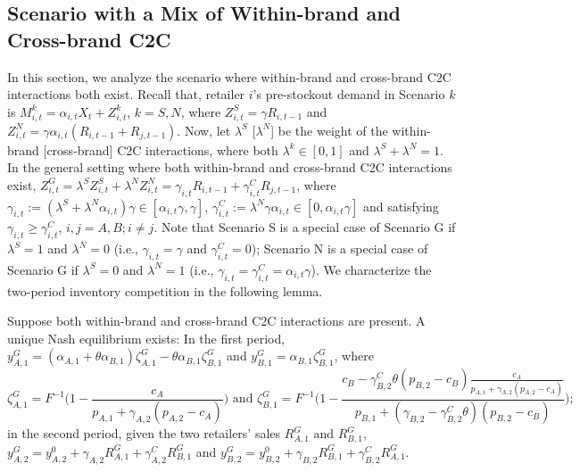 \documentclass[nonblindrev,copyedit]{informs1}
\begin{document}
\begin{APPENDICES}
\section{Scenario with a Mix of Within-brand and Cross-brand C2C} \label{appdx-mix}
In this section, we analyze the scenario where within-brand and cross-brand C2C interactions both exist. Recall that, retailer $i$'s pre-stockout demand in Scenario $k$ is $M^k_{i,t} = \alpha_{i,t} X_t + Z^k_{i,t}$, $k = S, N$, where $Z^S_{i,t} = \gamma R_{i,t-1}$ and $Z^N_{i,t} = \gamma \alpha_{i,t} ( R_{i,t-1} + R_{j,t-1})$. Now, let $\lambda^S$ [$\lambda^N$] be the weight of the within-brand [cross-brand] C2C interactions, where both $\lambda^k \in [0,1]$ and $\lambda^S + \lambda^N = 1$. In the general setting where both within-brand and cross-brand C2C interactions exist, $Z^G_{i,t} = \lambda^S Z^S_{i,t} + \lambda^N Z^N_{i,t} = \gamma_{i,t} R_{i,t-1} + \gamma^C_{i,t}  R_{j, t-1}$, where $\gamma_{i,t}:=(\lambda^S + \lambda^N \alpha_{i,t}) \gamma \in [\alpha_{i,t} \gamma, \gamma]$, $\gamma^C_{i,t} := \lambda^N \gamma \alpha_{i,t} \in [0, \alpha_{i,t} \gamma]$ and satisfying $\gamma_{i,t} \geq \gamma^C_{i,t}$, $i,j = A, B; i \neq j$. Note that Scenario S is a special case of Scenario G if $\lambda^S = 1$ and $\lambda^N = 0$ (i.e., $\gamma_{i,t} = \gamma$ and $\gamma^C_{i,t} = 0$); Scenario N is a special case of Scenario G if $\lambda^S = 0$ and $\lambda^N = 1$ (i.e., $\gamma_{i,t} = \gamma^C_{i,t} = \alpha_{i,t}\gamma$). We characterize the two-period inventory competition in the following lemma.

\begin{lemma}
\label{lem:modelg}
Suppose both within-brand and cross-brand C2C interactions are present. A unique Nash equilibrium exists: In the first period, $y^{G}_{A,1} = (\alpha_{A,1} + \theta \alpha_{B,1}) \zeta_{A,1}^G - \theta \alpha_{B,1} \zeta_{B,1}^G$ and $y^{G}_{B,1} = \alpha_{B,1} \zeta_{B,1}^G$, where
\[
\zeta^G_{A,1} = F^{-1} \bigg( 1- \frac{c_A}{p_{A,1} + \gamma_{A,2} (p_{A,2} -c_A)} \bigg)\text{ and }
        \zeta^G_{B,1}= F^{-1} \bigg( 1- \frac{c_B - \gamma^C_{B,2} \theta (p_{B,2} -c_B)  \frac{c_A}{p_{A,1} + \gamma_{A,2} (p_{A,2}-c_A)}}{p_{B,1} + (\gamma_{B,2}-\gamma^C_{B,2}\theta )(p_{B,2} -c_B)} \bigg);
\]
in the second period, given the two retailers' sales $R_{A,1}^G$ and $R_{B,1}^G$, $y^{G}_{A,2} = y_{A,2}^0 + \gamma_{A,2} R_{A,1}^G + \gamma^C_{A,2} R^G_{B,1}$ and $y^{G}_{B,2} = y_{B,2}^0 + \gamma_{B,2} R_{B,1}^G + \gamma^C_{B,2} R^G_{A,1}$.
\end{lemma}


\end{APPENDICES}
\end{document}
